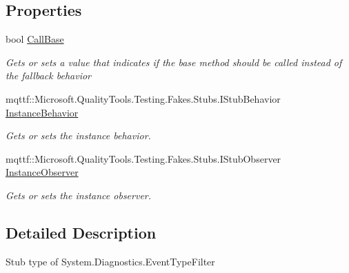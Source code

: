 \subsection*{Properties}
\begin{DoxyCompactItemize}
\item 
bool \hyperlink{class_system_1_1_diagnostics_1_1_fakes_1_1_stub_event_type_filter_a965f3efd23b86fa1c5a17b7a4c844be9}{Call\-Base}
\begin{DoxyCompactList}\small\item\em Gets or sets a value that indicates if the base method should be called instead of the fallback behavior\end{DoxyCompactList}\item 
mqttf\-::\-Microsoft.\-Quality\-Tools.\-Testing.\-Fakes.\-Stubs.\-I\-Stub\-Behavior \hyperlink{class_system_1_1_diagnostics_1_1_fakes_1_1_stub_event_type_filter_ac8e27d3939921f231cfd25c1526cc441}{Instance\-Behavior}
\begin{DoxyCompactList}\small\item\em Gets or sets the instance behavior.\end{DoxyCompactList}\item 
mqttf\-::\-Microsoft.\-Quality\-Tools.\-Testing.\-Fakes.\-Stubs.\-I\-Stub\-Observer \hyperlink{class_system_1_1_diagnostics_1_1_fakes_1_1_stub_event_type_filter_a8ba88853c3c40a24a66c03f956822de7}{Instance\-Observer}
\begin{DoxyCompactList}\small\item\em Gets or sets the instance observer.\end{DoxyCompactList}\end{DoxyCompactItemize}


\subsection{Detailed Description}
Stub type of System.\-Diagnostics.\-Event\-Type\-Filter



